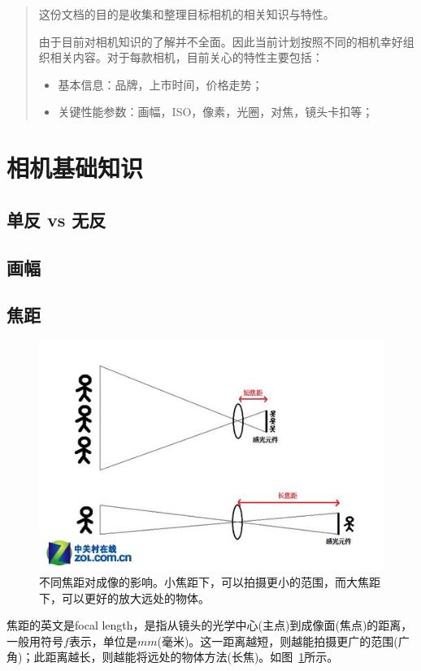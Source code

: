\documentclass{ctexart}
\begin{document}
\tableofcontents

\begin{abstract}
这份文档的目的是收集和整理目标相机的相关知识与特性。

由于目前对相机知识的了解并不全面。因此当前计划按照不同的相机幸好组织相关内容。对于每款相机，目前关心的特性主要包括：
\begin{itemize}
    \item 基本信息：品牌，上市时间，价格走势；
    \item 关键性能参数：画幅，ISO，像素，光圈，对焦，镜头卡扣等；
\end{itemize}
\end{abstract}

\section{相机基础知识}

\subsection{单反 vs 无反}

\subsection{画幅}

\subsection{焦距~\cite{focal_length_shutter_etc}}
\begin{figure}[h!]
    \centering
    \label{fig_focal_length}
    \includegraphics[width=.8\linewidth]{imgs/focal_length.jpg}
    \caption{不同焦距对成像的影响。小焦距下，可以拍摄更小的范围，而大焦距下，可以更好的放大远处的物体。}
\end{figure}
焦距的英文是focal length，是指从镜头的光学中心(主点)到成像面(焦点)的距离，一般用符号$f$表示，单位是$mm$(毫米)。这一距离越短，则越能拍摄更广的范围(广角)；此距离越长，则越能将远处的物体方法(长焦)。如图~\ref{fig_focal_length}所示。
\end{document}
